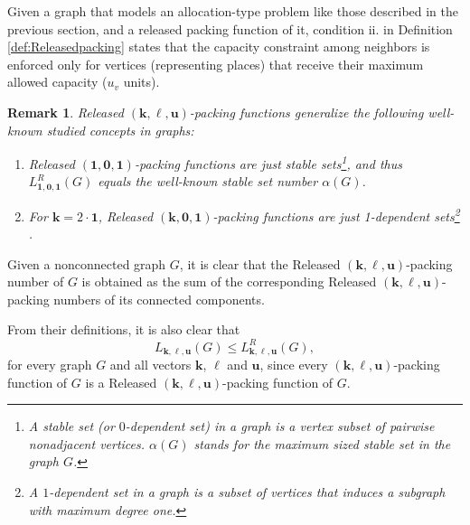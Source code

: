 \documentclass[preprint,12pt]{article}
\renewcommand{\leq}{\leqslant}
\newtheorem{remark}[theorem]{Remark}
\theoremstyle{definition}
\begin{document}
Given a graph that models an allocation-type problem like those described in the previous section, and a released packing function of it, condition ii. in Definition \ref{def:Releasedpacking} states that the capacity constraint among neighbors is enforced only for vertices (representing places) that receive their maximum allowed capacity ($u_v$ units).

\begin{remark}\label{rem:0} Released  $(\mathbf{k}, \boldsymbol\ell, \mathbf{u})$-packing functions generalize the following  well-known studied concepts in graphs:
\begin{enumerate}
    \item[i.]  Released $(\mathbf{1},\mathbf{0}, \mathbf{1})$-packing functions are just stable sets\footnote{A \emph{stable set} (or \emph{$0$-dependent set)} in a graph is a vertex subset of pairwise nonadjacent vertices. $\alpha(G)$ stands for the maximum sized stable set in the graph $G$.}, and thus $L^R_{\mathbf{1},\mathbf{0}, \mathbf{1}}(G)$ equals the well-known stable set number $\alpha(G)$. 
    \item [ii.] For  $\mathbf{k}=2 \cdot \mathbf{1}$, Released $(\mathbf{k},\mathbf{0}, \mathbf{1})$-packing functions are just 1-dependent sets\footnote{A \emph{$1$-dependent set}  in a graph is a subset of vertices that induces a subgraph  with maximum degree one.} \cite{Dessmark1993}. 
    \end{enumerate}
\end{remark}


Given a nonconnected graph $G$, it is clear that the Released  $(\mathbf{k}, \boldsymbol\ell, \mathbf{u})$-packing number of $G$ is obtained as the sum of the corresponding Released  $(\mathbf{k}, \boldsymbol\ell, \mathbf{u})$-packing numbers of its connected components. 

From their definitions, it is also clear that \begin{equation}\label{eq:eq} L_{\mathbf{k}, \boldsymbol\ell, \mathbf{u}}(G)  \leq L^R_{\mathbf{k},\boldsymbol\ell, \mathbf{u}}(G),
\end{equation}
for every graph $G$ and all vectors $\mathbf{k}$, $\boldsymbol\ell$ and $\mathbf{u}$, since every $(\mathbf{k}, \boldsymbol\ell, \mathbf{u})$-packing function of $G$ is a Released $(\mathbf{k}, \boldsymbol\ell, \mathbf{u})$-packing function of $G$.
\end{document}
